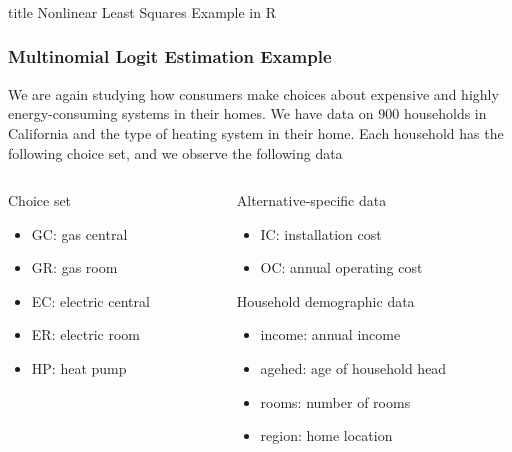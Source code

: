 \documentclass{beamer}
\begin{document}
\begin{frame}\frametitle{}
    \vfill
    \centering
    \begin{beamercolorbox}[center]{title}
        \Large Nonlinear Least Squares Example in R
    \end{beamercolorbox}
    \vfill
\end{frame}

\begin{frame}\frametitle{Multinomial Logit Estimation Example}
    We are again studying how consumers make choices about expensive and highly energy-consuming systems in their homes. We have data on 900 households in California and the type of heating system in their home. Each household has the following choice set, and we observe the following data \\
    \vspace{3ex}
    \begin{columns}
    	\begin{column}{0.5\textwidth}
		    Choice set
		    \begin{itemize}
		    	\item GC: gas central
		    	\item GR: gas room
		    	\item EC: electric central
		    	\item ER: electric room
		    	\item HP: heat pump
		    \end{itemize}
		    \vspace{8ex}
	    \end{column}
	    \begin{column}{0.5\textwidth}
		    Alternative-specific data
		    \begin{itemize}
		    	\item IC: installation cost
		    	\item OC: annual operating cost
		    \end{itemize}
		    \vspace{2ex}
		    Household demographic data
		    \begin{itemize}
		    	\item income: annual income
		    	\item agehed: age of household head
		    	\item rooms: number of rooms
                \item region: home location
		    \end{itemize}
		\end{column}
    \end{columns}
\end{frame}
\end{document}
